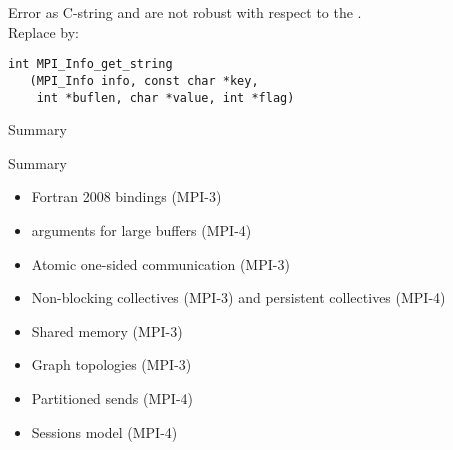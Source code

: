 \documentclass[11pt,headernav]{beamer}
\begin{document}
\begin{numberedframe}{Error as C-string}
  and 
 are not robust with respect to the  .\\
 Replace by:
\begin{lstlisting}
int MPI_Info_get_string
   (MPI_Info info, const char *key, 
    int *buflen, char *value, int *flag)  
\end{lstlisting}
\end{numberedframe}

 {Summary}

\begin{numberedframe}{Summary}
  \begin{itemize}
  \item Fortran 2008 bindings (MPI-3)
  \item {} arguments for large buffers (MPI-4)
  \item Atomic one-sided communication (MPI-3)
  \item Non-blocking collectives (MPI-3) and persistent collectives (MPI-4)
  \item Shared memory (MPI-3)
  \item Graph topologies (MPI-3)
  \item Partitioned sends (MPI-4)
  \item Sessions model (MPI-4)
  \end{itemize}
\end{numberedframe}


\begin{exerciseframe}[serialsend]
  \label{exserialsend}
  
\end{exerciseframe}

\begin{exerciseframe}[procgrid]
  
\end{exerciseframe}
\end{document}
